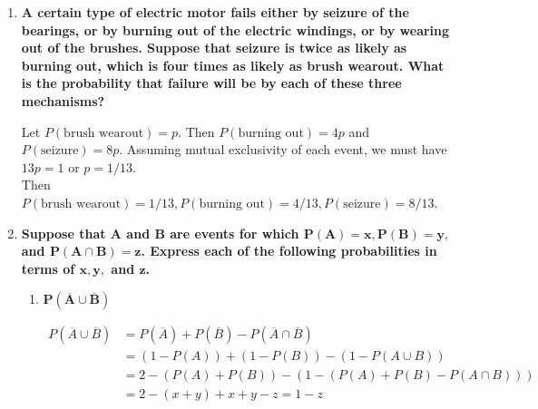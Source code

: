 \documentclass[10pt, oneside]{article}
\begin{document}
\begin{enumerate}[label=1.\arabic*]
\begin{proof}
Substituting $P(A \cap \overline{B}) = P(A) - P(A \cap B)$ and $P(B \cap \overline{A}) = P(B) - P(A \cap B)$ yields our desired result.

\end{proof}

\item  \begin{tcolorbox}[
  colback=Cerulean!5!white,
  colframe=Cerulean!75!black]
\textbf{A certain type of electric motor fails either by seizure of the bearings, or by burning out of the electric windings, or by wearing out of the brushes. Suppose that seizure is twice as likely as burning out, which is four times as likely as brush wearout. What is the probability that failure will be by each of these three mechanisms?}
\end{tcolorbox}

Let $P(\text{brush wearout}) = p$. Then $P(\text{burning out}) = 4p$ and $P(\text{seizure}) = 8p$. Assuming mutual exclusivity of each event, we must have $13p = 1$ or $p = 1/13$. \\
Then $\boxed{P(\text{brush wearout}) = 1/13, P(\text{burning out}) = 4/13, P(\text{seizure}) = 8/13}$.

\item  \begin{tcolorbox}[
  colback=Cerulean!5!white,
  colframe=Cerulean!75!black]
\textbf{Suppose that $\bm{A}$ and $\bm{B}$ are events for which $\bm{P(A) = x, P(B) = y,}$ and $\bm{P(A \cap B) = z}$. Express each of the following probabilities in terms of $\bm{x, y,}$ and $\bm{z}$.}
\end{tcolorbox}

	\begin{enumerate}
	\item  \begin{tcolorbox}[
	  colback=Cerulean!5!white,
	  colframe=Cerulean!75!black]
	\textbf{$\bm{P(\overline{A} \cup \overline{B})}$}
	\end{tcolorbox}
	
	\begin{align*}
	P(\overline{A} \cup \overline{B}) &= P(\overline{A}) + P(\overline{B}) - P(\overline{A} \cap \overline{B}) \\
	&= (1 - P(A)) + (1 - P(B)) - (1 - P(A \cup B)) \\
	&= 2 - (P(A) + P(B)) - (1 - (P(A) + P(B) - P(A \cap B))) \\
	&= 2 - (x+y) + x + y - z = \boxed{1 - z}
	\end{align*}
	

\end{enumerate}
\end{enumerate}
\end{document}
